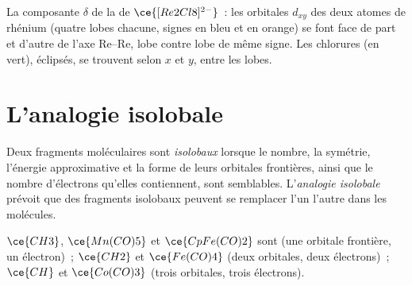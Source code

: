 \begin{omfigure}

{\small La composante $\delta$ de la  de $\ce{[Re2Cl8]^{2-}}$~: les orbitales $d_{xy}$ des
deux atomes de rhénium (quatre lobes chacune, signes en bleu et en orange)
se font face de part et d'autre de l'axe Re--Re, lobe contre lobe de même
signe. Les chlorures (en vert), éclipsés, se trouvent selon $x$ et $y$, entre les lobes.}
\end{omfigure}

\section{L'analogie isolobale}

\begin{definition}\label{def:b3:organometallic-bonding:isolobal}
Deux fragments moléculaires sont \emph{isolobaux}
lorsque le nombre, la symétrie, l'énergie approximative et la forme de leurs
orbitales frontières, ainsi que le nombre d'électrons qu'elles contiennent,
sont semblables. L'\emph{analogie isolobale} prévoit
que des fragments isolobaux peuvent se remplacer l'un l'autre dans les
molécules.
\end{definition}

\begin{proposition}\label{prop:b3:organometallic-bonding:isolobal}
$\ce{CH3}$, $\ce{Mn(CO)5}$ et $\ce{CpFe(CO)2}$ sont  (une orbitale frontière, un électron)~;
$\ce{CH2}$ et $\ce{Fe(CO)4}$ (deux orbitales, deux électrons)~; $\ce{CH}$ et $\ce{Co(CO)3}$ (trois orbitales,
trois électrons).
\end{proposition}

